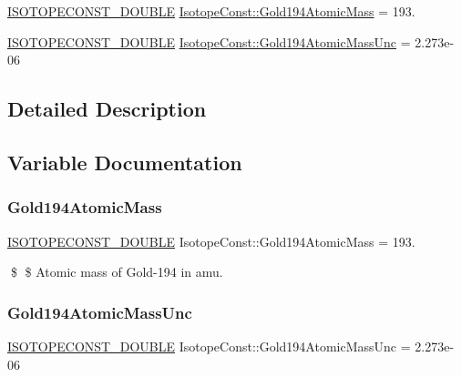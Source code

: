 \begin{DoxyCompactItemize}
\item 
\mbox{\hyperlink{group___isotope_const-_macros_ga8f45a7272ce02c0b4c65c44636ed719a}{I\+S\+O\+T\+O\+P\+E\+C\+O\+N\+S\+T\+\_\+\+D\+O\+U\+B\+LE}} \mbox{\hyperlink{group___isotope_const-_gold-_au194_ga6fa735a49c3fdbd7061dd08a7fd96a0c}{Isotope\+Const\+::\+Gold194\+Atomic\+Mass}} = 193.
\item 
\mbox{\hyperlink{group___isotope_const-_macros_ga8f45a7272ce02c0b4c65c44636ed719a}{I\+S\+O\+T\+O\+P\+E\+C\+O\+N\+S\+T\+\_\+\+D\+O\+U\+B\+LE}} \mbox{\hyperlink{group___isotope_const-_gold-_au194_gaec124c0d09d75a8d408212d8fbf19ae0}{Isotope\+Const\+::\+Gold194\+Atomic\+Mass\+Unc}} = 2.\+273e-\/06
\end{DoxyCompactItemize}


\subsection{Detailed Description}


\subsection{Variable Documentation}
\mbox{\label{group___isotope_const-_gold-_au194_ga6fa735a49c3fdbd7061dd08a7fd96a0c}} 
\subsubsection{\texorpdfstring{Gold194\+Atomic\+Mass}{Gold194AtomicMass}}
{\footnotesize\ttfamily \mbox{\hyperlink{group___isotope_const-_macros_ga8f45a7272ce02c0b4c65c44636ed719a}{I\+S\+O\+T\+O\+P\+E\+C\+O\+N\+S\+T\+\_\+\+D\+O\+U\+B\+LE}} Isotope\+Const\+::\+Gold194\+Atomic\+Mass = 193.}

\$ \$ Atomic mass of Gold-\/194 in amu. \mbox{\label{group___isotope_const-_gold-_au194_gaec124c0d09d75a8d408212d8fbf19ae0}} 
\subsubsection{\texorpdfstring{Gold194\+Atomic\+Mass\+Unc}{Gold194AtomicMassUnc}}
{\footnotesize\ttfamily \mbox{\hyperlink{group___isotope_const-_macros_ga8f45a7272ce02c0b4c65c44636ed719a}{I\+S\+O\+T\+O\+P\+E\+C\+O\+N\+S\+T\+\_\+\+D\+O\+U\+B\+LE}} Isotope\+Const\+::\+Gold194\+Atomic\+Mass\+Unc = 2.\+273e-\/06}

